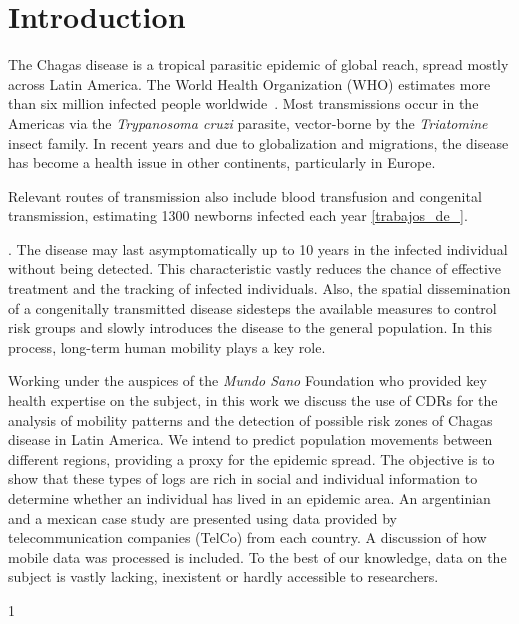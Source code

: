 \section{Introduction}

The Chagas disease is a tropical parasitic epidemic of global reach, spread mostly across Latin America. The World Health Organization (WHO) estimates more than six million infected people worldwide~\cite{who2016}. Most transmissions occur in the Americas via the \textit{Trypanosoma cruzi} parasite, vector-borne by the \textit{Triatomine} insect family. In recent years and due to globalization and migrations, the disease has become a health issue in other continents, particularly in Europe. 

Relevant routes of transmission also include blood transfusion and congenital transmission, estimating 1300 newborns infected each year \ref{trabajos_de_}.\begin{comment}  en el drive estan las ppt del min salud \end{comment}. The disease may last asymptomatically up to 10 years in the infected individual without being detected. This characteristic vastly reduces the chance of effective treatment and the tracking of infected individuals. Also, the spatial dissemination of a congenitally transmitted disease sidesteps the available measures to control risk groups and slowly introduces the disease to the general population. In this process, long-term human mobility plays a key role.

Working under the auspices of the \textit{Mundo Sano} Foundation who provided key health expertise on the subject, in this work we discuss the use of CDRs for the analysis of mobility patterns and the detection of possible risk zones of Chagas disease in Latin America. We intend to predict population movements between different regions, providing a proxy for the epidemic spread. The objective is to show that these types of logs are rich in social and individual information to determine whether an individual has lived in an epidemic area. An argentinian and a mexican case study are presented using data provided by telecommunication companies (TelCo) from each country. A discussion of how mobile data was processed is included. To the best of our knowledge, data on the subject is vastly lacking, inexistent or hardly accessible to researchers. 


1